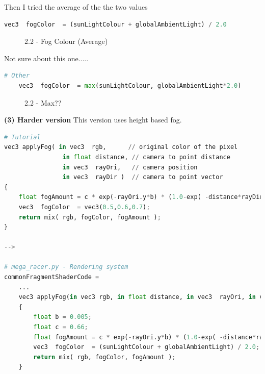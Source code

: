 \documentclass[a4 paper, 12pt]{article}
\begin{document}
Then I tried the average of the the two values
\begin{lstlisting}[language=python]
    vec3  fogColor  = (sunLightColour + globalAmbientLight) / 2.0
\end{lstlisting}

\begin{figure} [H]
    \caption{2.2 - Fog Colour (Average)}   
\end{figure}



Not sure about this one.....
\begin{lstlisting}[language=python]  
    # Other
    vec3  fogColor  = max(sunLightColour, globalAmbientLight*2.0)
\end{lstlisting}
\begin{figure} [H]
    \caption{2.2 - Max??}   
\end{figure}

\textbf{(3) Harder version}
This version uses height based fog.
\begin{lstlisting}[language=python]
# Tutorial
vec3 applyFog( in vec3  rgb,      // original color of the pixel
                in float distance, // camera to point distance
                in vec3  rayOri,   // camera position
                in vec3  rayDir )  // camera to point vector
{
    float fogAmount = c * exp(-rayOri.y*b) * (1.0-exp( -distance*rayDir.y*b ))/rayDir.y;
    vec3  fogColor  = vec3(0.5,0.6,0.7);
    return mix( rgb, fogColor, fogAmount );
}

-->

# mega_racer.py - Rendering system
commonFragmentShaderCode = 
    ...
    vec3 applyFog(in vec3 rgb, in float distance, in vec3  rayOri, in vec3 rayDir)
    {
        float b = 0.005;
        float c = 0.66;
        float fogAmount = c * exp(-rayOri.y*b) * (1.0-exp( -distance*rayDir.y*b ))/rayDir.y;
        vec3  fogColor  = (sunLightColour + globalAmbientLight) / 2.0;
        return mix( rgb, fogColor, fogAmount );
    }
\end{lstlisting} 
\end{document}
